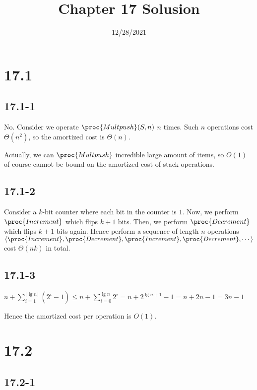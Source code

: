 

\title{Chapter 17 Solusion}
\date{12/28/2021}


\maketitle

\section*{17.1}

\subsection*{17.1-1}

No.
Consider we operate $\proc{Multpush}(S,n)$ $n$ times.
Such $n$ operations cost $\Theta(n^2)$, 
so the amortized cost is $\Theta(n)$.

Actually, we can $\proc{Multpush}$ incredible large amount of items,
so $O(1)$ of course cannot be bound on the amortized cost
of stack operations.

\subsection*{17.1-2}

Consider a $k$-bit counter where each bit in the counter is $1$.
Now, we perform $\proc{Increment}$ which flips $k+1$ bits.
Then, we perform $\proc{Decrement}$ which flips $k+1$ bits again.
Hence perform a sequence of length $n$ operations 
$\langle \proc{Increment}, \proc{Decrement}, 
\proc{Increment}, \proc{Decrement}, \cdots \rangle$
cost $\Theta(nk)$ in total.

\subsection*{17.1-3}

$n + \sum\limits_{i = 1}^{\lfloor \lg n \rfloor} (2^i - 1)
\leq n + \sum\limits_{i = 0}^{\lg n} 2^i
= n + 2^{\lg n + 1} - 1 = n + 2n - 1 = 3n - 1$

Hence the amortized cost per operation is $O(1)$.

\section*{17.2}

\subsection*{17.2-1}

